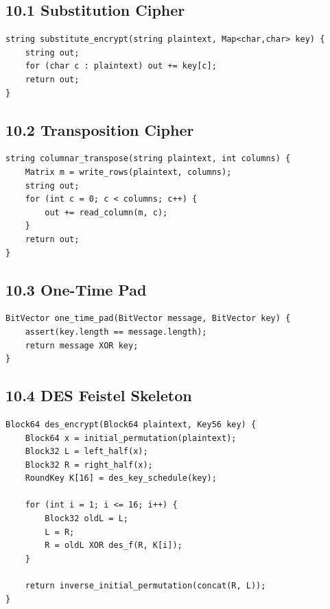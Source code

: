 \documentclass[11pt]{article}
\begin{document}
\subsection{10.1 Substitution Cipher}\label{substitution-cipher}

\begin{verbatim}
string substitute_encrypt(string plaintext, Map<char,char> key) {
    string out;
    for (char c : plaintext) out += key[c];
    return out;
}
\end{verbatim}

\subsection{10.2 Transposition Cipher}\label{transposition-cipher}

\begin{verbatim}
string columnar_transpose(string plaintext, int columns) {
    Matrix m = write_rows(plaintext, columns);
    string out;
    for (int c = 0; c < columns; c++) {
        out += read_column(m, c);
    }
    return out;
}
\end{verbatim}

\subsection{10.3 One-Time Pad}\label{one-time-pad}

\begin{verbatim}
BitVector one_time_pad(BitVector message, BitVector key) {
    assert(key.length == message.length);
    return message XOR key;
}
\end{verbatim}

\subsection{10.4 DES Feistel Skeleton}\label{des-feistel-skeleton}

\begin{verbatim}
Block64 des_encrypt(Block64 plaintext, Key56 key) {
    Block64 x = initial_permutation(plaintext);
    Block32 L = left_half(x);
    Block32 R = right_half(x);
    RoundKey K[16] = des_key_schedule(key);

    for (int i = 1; i <= 16; i++) {
        Block32 oldL = L;
        L = R;
        R = oldL XOR des_f(R, K[i]);
    }

    return inverse_initial_permutation(concat(R, L));
}
\end{verbatim}
\end{document}
